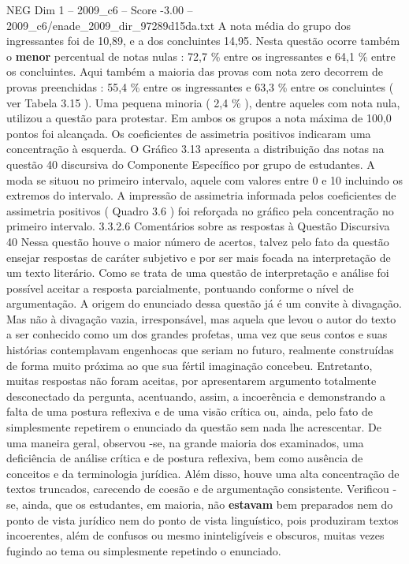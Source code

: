 \begin{textsample}{NEG Dim 1 – 2009\_c6 – Score -3.00 – 2009\_c6/enade\_2009\_dir\_97289d15da.txt}
A nota média do grupo dos ingressantes foi de 10,89, e a dos concluintes 14,95.
Nesta questão ocorre também o \textbf{menor} percentual de notas nulas : 72,7 \% entre os ingressantes e 64,1 \% entre os concluintes.
Aqui também a maioria das provas com nota zero decorrem de provas preenchidas : 55,4 \% entre os ingressantes e 63,3 \% entre os concluintes ( ver Tabela 3.15 ).
Uma pequena minoria ( 2,4 \% ), dentre aqueles com nota nula, utilizou a questão para protestar.
Em ambos os grupos a nota máxima de 100,0 pontos foi alcançada.
Os coeficientes de assimetria positivos indicaram uma concentração à esquerda.
O Gráfico 3.13 apresenta a distribuição das notas na questão 40 discursiva do Componente Específico por grupo de estudantes.
A moda se situou no primeiro intervalo, aquele com valores entre 0 e 10 incluindo os extremos do intervalo.
A impressão de assimetria informada pelos coeficientes de assimetria positivos ( Quadro 3.6 ) foi reforçada no gráfico pela concentração no primeiro intervalo. 3.3.2.6 Comentários sobre as respostas à Questão Discursiva 40 Nessa questão houve o maior número de acertos, talvez pelo fato da questão ensejar respostas de caráter subjetivo e por ser mais focada na interpretação de um texto literário.
Como se trata de uma questão de interpretação e análise foi possível aceitar a resposta parcialmente, pontuando conforme o nível de argumentação.
A origem do enunciado dessa questão já é um convite à divagação.
Mas não à divagação vazia, irresponsável, mas aquela que levou o autor do texto a ser conhecido como um dos grandes profetas, uma vez que seus contos e suas histórias contemplavam engenhocas que seriam no futuro, realmente construídas de forma muito próxima ao que sua fértil imaginação concebeu.
Entretanto, muitas respostas não foram aceitas, por apresentarem argumento totalmente desconectado da pergunta, acentuando, assim, a incoerência e demonstrando a falta de uma postura reflexiva e de uma visão crítica ou, ainda, pelo fato de simplesmente repetirem o enunciado da questão sem nada lhe acrescentar.
De uma maneira geral, observou -se, na grande maioria dos examinados, uma deficiência de análise crítica e de postura reflexiva, bem como ausência de conceitos e da terminologia jurídica.
Além disso, houve uma alta concentração de textos truncados, carecendo de coesão e de argumentação consistente.
Verificou -se, ainda, que os estudantes, em maioria, não \textbf{estavam} bem preparados nem do ponto de vista jurídico nem do ponto de vista linguístico, pois produziram textos incoerentes, além de confusos ou mesmo ininteligíveis e obscuros, muitas vezes fugindo ao tema ou simplesmente repetindo o enunciado.

\end{textsample}
